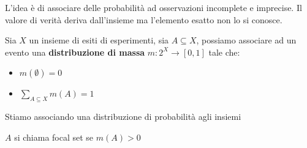 L'idea è di associare delle probabilità ad osservazioni incomplete e imprecise.
Il valore di verità deriva dall'insieme ma l'elemento esatto non lo si conosce.

\begin{definizione}
    Sia $X$ un insieme di esiti di esperimenti, sia $A\subseteq X$, possiamo associare
    ad un evento una \textbf{distribuzione di massa} $m:2^X\to [0,1]$ tale che:
    \begin{itemize}
        \item $m(\emptyset) = 0$
        \item $\sum_{A\subseteq X}m(A) = 1$
    \end{itemize}
\end{definizione}
Stiamo associando una distribuzione di probabilità agli insiemi
\begin{definizione}
    $A$ si chiama focal set se $m(A)>0$ 
\end{definizione}

